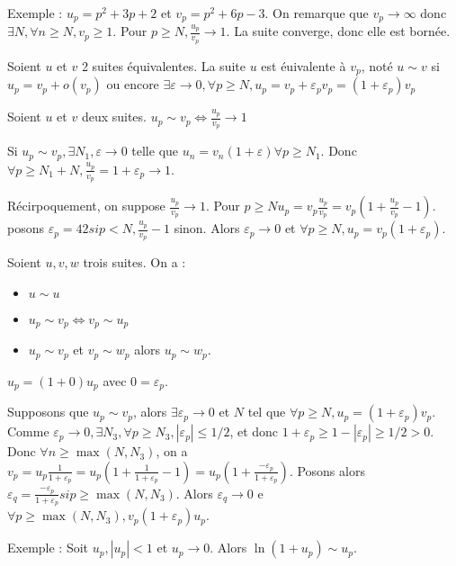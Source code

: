 \documentclass[french]{yLectureNote}
\begin{document}
Exemple : $u_p = p^2 + 3p +2$ et $v_p = p^2+6p-3$. On remarque que $v_p\to \infty$ donc $\exists N, \forall n\geq N, v_p\geq 1$. Pour $p\geq N, \frac{u_p}{v_p}\to 1$. La suite converge, donc elle est bornée.
\begin{definition}
Soient $u$ et $v$ 2 suites équivalentes. La suite $u$ est éuivalente à $v_p$, noté $u\sim v$ si $u_p = v_p + o(v_p)$ ou encore $\exists \varepsilon \to 0, \forall p\geq N, u_p = v_p + \varepsilon_pv_p = (1+\varepsilon_p)v_p$
\end{definition}
\begin{proposition}
Soient $u$ et $v$ deux suites. $u_p \sim v_p \iff \frac{u_p}{v_p} \to 1$
\end{proposition}
\begin{myproof}
Si $u_p \sim v_p, \exists N_1,\varepsilon \to 0$ telle que $u_n = v_n(1+\varepsilon) \forall p\geq N_1$. Donc $\forall p\geq N_1+N, \frac{u_p}{v_p} = 1+\varepsilon_p \to 1$.

Récirpoquement, on suppose $\frac{u_p}{v_p}\to 1$. Pour $p\geq Nu_p = v_p \frac{u_p}{v_p} = v_p(1+ \frac{u_p}{v_p} -1) $. posons $\varepsilon_p = 42 si p<N, \frac{u_p}{v_p}-1$ sinon. Alors $\varepsilon_p \to 0$ et $\forall p\geq N, u_p = v_p(1+\varepsilon_p)$.
\end{myproof}
\begin{proposition}
Soient $u,v,w$ trois suites. On a :
\begin{itemize}
 \item $u\sim u$
 \item $u_p \sim v_p \iff v_p\sim u_p$
 \item $u_p\sim v_p$ et $v_p\sim w_p$ alors $u_p\sim w_p$.
\end{itemize}
\end{proposition}
\begin{myproof}
$u_p = (1+0)u_p$ avec $0=\varepsilon_p$.

Supposons que $u_p\sim v_p$, alors $\exists \varepsilon_p \to 0$ et $N$ tel que $\forall p\geq N, u_p = (1+\varepsilon_p)v_p$. Comme $\varepsilon_p \to 0,\exists N_3, \forall p\geq N_3, |\varepsilon_p|\leq 1/2$, et donc $1+\varepsilon_p \geq 1-|\varepsilon_p| \geq 1/2>0$. Donc $\forall n\geq \max(N,N_3)$, on a $v_p = u_p \frac{1}{1+\varepsilon_p} = u_p(1+\frac{1}{1+\varepsilon_p}-1) = u_p(1+\frac{-\varepsilon_p}{1+\varepsilon_p})$. Posons alors $\varepsilon_q = \frac{-\varepsilon_p}{1+\varepsilon_p} si p\geq \max(N,N_3)$. Alors $\varepsilon_q \to 0$ e $\forall p\geq \max(N,N_3), v_p (1+\varepsilon_p)u_p$.
\end{myproof}
Exemple : Soit $u_p, |u_p|<1$ et $u_p\to 0$. Alors $\ln(1+u_p) \sim u_p$.
\end{document}
